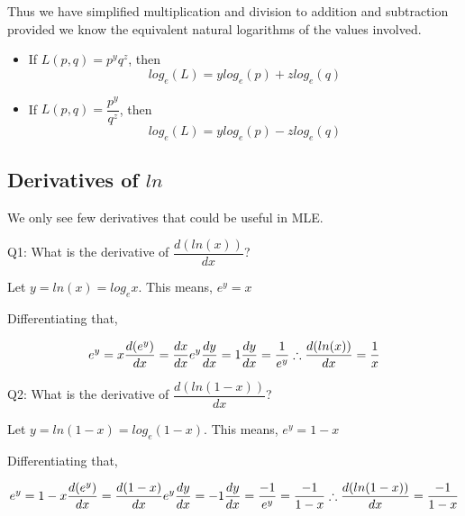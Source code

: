 \documentclass[float=false,crop=false]{standalone}
\begin{document}
Thus we have simplified multiplication and division to addition and
subtraction provided we know the equivalent natural logarithms of the
values involved.
\begin{tcolorbox}[colback=green!5,colframe=green!40!black,title=Multiplication and Divison Simplification]
\begin{itemize}
\item If $L(p,q) = p^yq^z$, then 
\begin{equation}
    log_e(L) = ylog_e(p) + zlog_e(q)  \label{eq:MA04}
\end{equation}
\item If $L(p,q) = \dfrac{p^y}{q^z}$, then 
\begin{equation}
    log_e(L) = ylog_e(p) - zlog_e(q)  \label{eq:MA05}
\end{equation}
\end{itemize}
\end{tcolorbox}
    \subsection{\texorpdfstring{Derivatives of
\(ln\)}{Derivatives of ln}}\label{derivatives-of-ln}

We only see few derivatives that could be useful in MLE.

Q1: What is the derivative of \(\dfrac{d(ln(x))}{dx}\)?

Let \(y = ln(x) = log_ex\). This means, \(e^y = x\)

Differentiating that,

\[
e^y = x \\
\dfrac{d(e^y)}{dx} = \dfrac{dx}{dx} \\
e^y\dfrac{dy}{dx} = 1 \\
\dfrac{dy}{dx} = \dfrac{1}{e^y} \\
\therefore \dfrac{d(ln(x))}{dx} = \dfrac{1}{x}
\]

    Q2: What is the derivative of \(\dfrac{d(ln(1 - x))}{dx}\)?

Let \(y = ln(1 - x) = log_e(1-x)\). This means, \(e^y = 1 - x\)

Differentiating that,

\[
e^y = 1 - x \\
\dfrac{d(e^y)}{dx} = \dfrac{d(1-x)}{dx} \\
e^y\dfrac{dy}{dx} = -1 \\
\dfrac{dy}{dx} = \dfrac{-1}{e^y} = \dfrac{-1}{1 - x} \\
\therefore \dfrac{d(ln(1-x))}{dx} = \dfrac{-1}{1 - x}
\]
\end{document}
